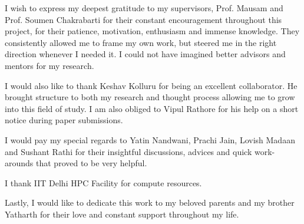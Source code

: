 
\noindent I wish to express my deepest gratitude to my supervisors, Prof. Mausam and Prof. Soumen Chakrabarti for their constant encouragement throughout this project, for their patience, motivation, enthusiasm and immense knowledge. They consistently allowed me to frame my own work, but steered me in the right direction whenever I needed it. I could not have imagined better advisors and mentors for my research.

\noindent I would also like to thank Keshav Kolluru for being an excellent collaborator. He brought structure to both my research and thought process allowing me to grow into this field of study. I am also obliged to Vipul Rathore for his help on a short notice during paper submissions.

\noindent I would pay my special regards to Yatin Nandwani, Prachi Jain, Lovish Madaan and Sushant Rathi for their insightful discussions, advices and quick work-arounds that proved to be very helpful.

\noindent I thank IIT Delhi HPC Facility for compute resources.

\noindent Lastly, I would like to dedicate this work to my beloved parents and my brother Yatharth for their love and constant support throughout my life.